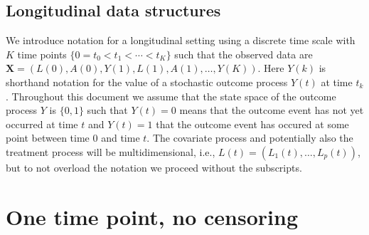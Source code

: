 \documentclass{article}
\newcommand{\A}{A}
\renewcommand{\L}{L}
\newcommand{\Y}{Y}
\begin{document}
\subsection{Longitudinal data structures}

We introduce notation for a longitudinal setting using a discrete time
scale with \(K\) time points \(\{0=t_0 < t_1 < \cdots < t_K\}\) such
that the observed data are
$\textbf{X}=(\L(0),\A(0),\Y(1),\L(1),\A(1),\dots,\Y(K))$. Here
\(\Y(k)\) is shorthand notation for the value of a stochastic outcome
process \(\Y(t)\) at time \(t_k\). Throughout this document we assume
that the state space of the outcome process \(Y\) is \(\{0,1\}\) such
that \(\Y(t)=0\) means that the outcome event has not yet occurred at
time \(t\) and \(\Y(t)=1\) that the outcome event has occured at some
point between time \(0\) and time \(t\). The covariate process and
potentially also the treatment process will be multidimensional, i.e.,
\(\L(t)=(\L_1(t),\dots,\L_p(t))\), but to not overload the notation we
proceed without the subscripts.

\section{One time point, no censoring}
\end{document}

